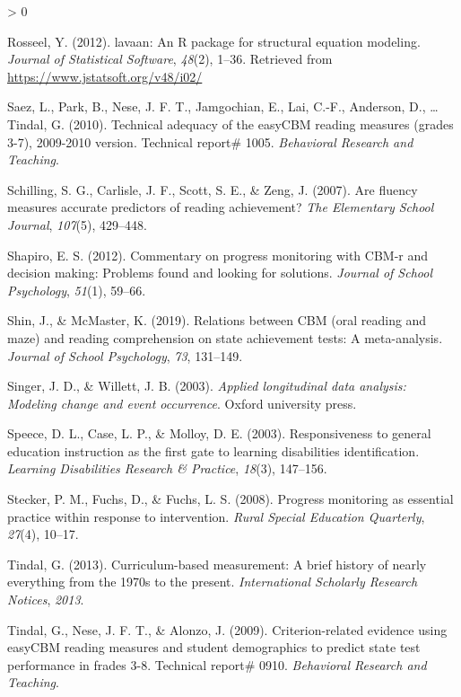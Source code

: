 \documentclass[
  english,
  man, fleqn, noextraspace]{apa6}
\newlength{\cslhangindent}
\newenvironment{CSLReferences}[2] %
 {%
  \setlength{\parindent}{0pt}
  \ifodd #1 \everypar{\setlength{\hangindent}{\cslhangindent}}\ignorespaces\fi
  \ifnum #2 > 0
  \setlength{\parskip}{#2\baselineskip}
  \fi
 }%
 {}
\begin{document}
\begin{CSLReferences}{1}{0}
\leavevmode\hypertarget{ref-R-lavaan}{}%
Rosseel, Y. (2012). {lavaan}: An {R} package for structural equation modeling. \emph{Journal of Statistical Software}, \emph{48}(2), 1--36. Retrieved from \url{https://www.jstatsoft.org/v48/i02/}

\leavevmode\hypertarget{ref-saez2010tech}{}%
Saez, L., Park, B., Nese, J. F. T., Jamgochian, E., Lai, C.-F., Anderson, D., \ldots{} Tindal, G. (2010). Technical adequacy of the easyCBM reading measures (grades 3-7), 2009-2010 version. Technical report\# 1005. \emph{Behavioral Research and Teaching}.

\leavevmode\hypertarget{ref-schilling2007}{}%
Schilling, S. G., Carlisle, J. F., Scott, S. E., \& Zeng, J. (2007). Are fluency measures accurate predictors of reading achievement? \emph{The Elementary School Journal}, \emph{107}(5), 429--448.

\leavevmode\hypertarget{ref-shapiro2012}{}%
Shapiro, E. S. (2012). Commentary on progress monitoring with CBM-r and decision making: Problems found and looking for solutions. \emph{Journal of School Psychology}, \emph{51}(1), 59--66.

\leavevmode\hypertarget{ref-shin2019}{}%
Shin, J., \& McMaster, K. (2019). Relations between CBM (oral reading and maze) and reading comprehension on state achievement tests: A meta-analysis. \emph{Journal of School Psychology}, \emph{73}, 131--149.

\leavevmode\hypertarget{ref-singerwillett2003}{}%
Singer, J. D., \& Willett, J. B. (2003). \emph{Applied longitudinal data analysis: Modeling change and event occurrence}. Oxford university press.

\leavevmode\hypertarget{ref-speece2003}{}%
Speece, D. L., Case, L. P., \& Molloy, D. E. (2003). Responsiveness to general education instruction as the first gate to learning disabilities identification. \emph{Learning Disabilities Research \& Practice}, \emph{18}(3), 147--156.

\leavevmode\hypertarget{ref-stecker2008}{}%
Stecker, P. M., Fuchs, D., \& Fuchs, L. S. (2008). Progress monitoring as essential practice within response to intervention. \emph{Rural Special Education Quarterly}, \emph{27}(4), 10--17.

\leavevmode\hypertarget{ref-tindal2013}{}%
Tindal, G. (2013). Curriculum-based measurement: A brief history of nearly everything from the 1970s to the present. \emph{International Scholarly Research Notices}, \emph{2013}.

\leavevmode\hypertarget{ref-tindal2009}{}%
Tindal, G., Nese, J. F. T., \& Alonzo, J. (2009). Criterion-related evidence using easyCBM reading measures and student demographics to predict state test performance in frades 3-8. Technical report\# 0910. \emph{Behavioral Research and Teaching}.


\end{CSLReferences}
\end{document}

